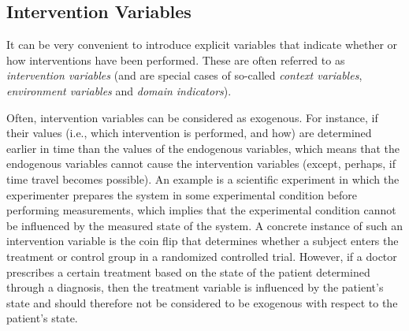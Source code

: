\subsection{Intervention Variables}\label{sec:intervention_variables}

It can be very convenient to introduce explicit variables that indicate whether or how
interventions have been performed. These are often referred to as \emph{intervention variables}
(and are special cases of so-called \emph{context variables}, \emph{environment variables} and \emph{domain indicators}).

Often, intervention variables can be considered as exogenous. For instance, if their values (i.e., which intervention
is performed, and how) are determined earlier in time than the values of the endogenous variables, 
which means that the endogenous variables cannot cause the intervention variables (except, perhaps, if
time travel becomes possible). An
example is a scientific experiment in which the experimenter prepares the system in some 
experimental condition before performing measurements, which implies that the experimental condition 
cannot be influenced by the measured state of the system. 
A concrete instance of such an intervention variable is 
the coin flip that determines whether a subject enters the treatment or control group in a
randomized controlled trial. 
However, if a doctor prescribes a certain treatment based on 
the state of the patient determined through a diagnosis, then the treatment variable is 
influenced by the patient's state and should therefore not be considered to be exogenous with
respect to the patient's state.

